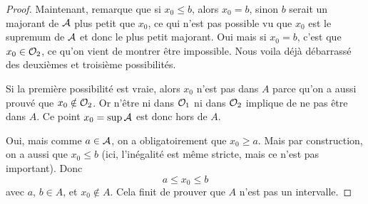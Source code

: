 \begin{proof}
	Maintenant, remarque que si $x_0\leq b$, alors $x_0=b$, sinon $b$ serait un majorant de $\mathcal{A}$ plus petit que $x_0$, ce qui n'est pas possible vu que $x_0$ est le supremum de $\mathcal{A}$ et donc le plus petit majorant. Oui mais si $x_0=b$, c'est que $x_0\in\mathcal{O}_2$, ce qu'on vient de montrer être impossible. Nous voila déjà débarrassé des deuxièmes et troisième possibilités. 

	Si la première possibilité est vraie, alors $x_0$ n'est pas dans $A$ parce qu'on a aussi prouvé que $x_0\notin\mathcal{O}_2$. Or n'être ni dans $\mathcal{O}_1$ ni dans $\mathcal{O}_2$ implique de ne pas être dans $A$. Ce point $x_0=\sup\mathcal{A}$ est donc hors de $A$.

	Oui, mais comme $a\in\mathcal{A}$, on a obligatoirement que $x_0\geq a$. Mais par construction, on a aussi que $x_0\leq b$ (ici, l'inégalité est même stricte, mais ce n'est pas important). Donc
	\[ 
	  a\leq x_0\leq b
	\]
	avec $a$, $b\in A$, et $x_0\notin A$. Cela finit de prouver que $A$ n'est pas un intervalle.
\end{proof}


